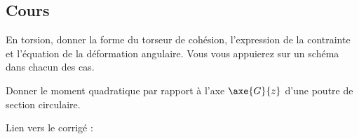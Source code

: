 \documentclass[10pt,fleqn]{article} %
\newcommand{\repRel}{../../..}
\newcommand{\repExo}{dossier}
\newcommand{\repStyle}{\repRel/Style}
\def\xxactivite{Colle 01}
\begin{document}
\begin{multicols}{2}
\section*{Cours}
En torsion, donner la forme du torseur de cohésion, l'expression de la contrainte et l'équation de la déformation angulaire. Vous vous appuierez sur un schéma dans chacun des cas. 

Donner le moment quadratique par rapport à l'axe $\axe{G}{z}$ d'une poutre de section circulaire.

\renewcommand{\repExo}{524_RdM}
\graphicspath{{\repRel/Style/png/}{\repRel/ExercicesCompetences/C2_MettreEnOeuvreDemarche/C2_10_RdM_Cohesion/\repExo/images/}}


\renewcommand{\repExo}{525_RdM}
\graphicspath{{\repRel/Style/png/}{\repRel/ExercicesCompetences/C2_MettreEnOeuvreDemarche/C2_10_RdM_Cohesion/\repExo/images/}}


\renewcommand{\repExo}{529_Passerelle}
\graphicspath{{\repRel/Style/png/}{\repRel/ExercicesCompetences/C2_MettreEnOeuvreDemarche/C2_10_RdM_Cohesion/\repExo/images/}}

\end{multicols}

Lien vers le corrigé : 


\livrettrue\def\xxactivite{Colle 03}
\newpage

\vspace{4cm}
\pagestyle{fancy}
\thispagestyle{plain}
\end{document}
